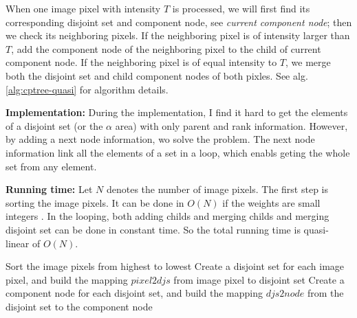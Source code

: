 When one image pixel with intensity $T$ is processed, we will first find its corresponding disjoint set and component node, see \emph{current component node}; then we check its neighboring pixels. If the neighboring pixel is of intensity larger than $T$, add the component node of the neighboring pixel to the child of current component node. If the neighboring pixel is of equal intensity to $T$, we merge both the disjoint set and child component nodes of both pixles. See alg.\ref{alg:cptree-quasi} for algorithm details.

\textbf{Implementation: } During the implementation, I find it hard to get the elements of a disjoint set (or the $\alpha$ area) with only parent and rank information. However, by adding a next node information, wo solve the problem. The next node information link all the elements of a set in a loop, which enabls geting the whole set from any element.

\textbf{Running time: } Let $N$ denotes the number of image pixels. The first step is sorting the image pixels. It can be done in $O(N)$ if the weights are small integers \cite{cormen2001introduction}. In the looping, both adding childs and merging childs and merging disjoint set can be done in constant time. So the total running time is quasi-linear of $O(N)$.

\begin{algorithm}[H]
\SetAlgoLined
{}
Sort the image pixels from highest to lowest\;
Create a disjoint set for each image pixel, and build the mapping $pixel2djs$ from image pixel to disjoint set\;
Create a component node for each disjoint set, and build the mapping $djs2node$ from the disjoint set to the component node\;

\end{algorithm}

